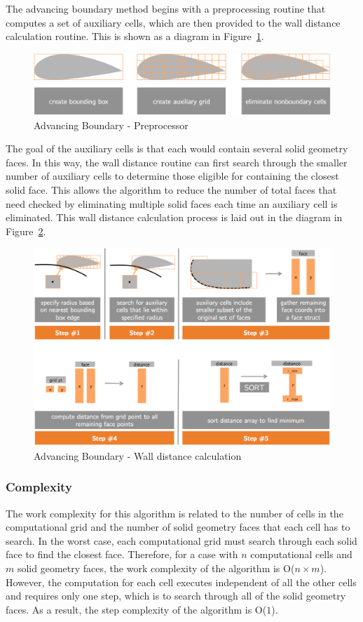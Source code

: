\documentclass[]{aiaa-tc}%
\begin{document}
The advancing boundary method begins with a preprocessing routine that
computes a set of auxiliary cells, which are then provided to the wall
distance calculation routine. This is shown
as a diagram in Figure~\ref{f:ab_preprocessor}.

\begin{figure}
  \centering
  \includegraphics[width=0.6\linewidth]{figures/preprocessor/preprocessor_diagram}
  \caption{Advancing Boundary - Preprocessor}
  \label{f:ab_preprocessor}
\end{figure}


The goal of the auxiliary cells is that each would contain several
solid geometry faces. In this way, the wall distance routine can first
search through the smaller number of auxiliary cells to determine
those eligible for containing the closest solid face. This allows the
algorithm to reduce the number of total faces that need checked by
eliminating multiple solid faces each time an auxiliary cell is
eliminated. This wall distance calculation process is laid out in the diagram
in Figure~\ref{f:ab_diagram}.


\begin{figure}
  \centering
  \includegraphics[width=0.7\linewidth]{figures/auxiliary_grid/algorithm_diagram}
  \caption{Advancing Boundary - Wall distance calculation}
  \label{f:ab_diagram}
\end{figure}



\subsubsection{Complexity}

The work complexity for this algorithm is related to the number of
cells in the computational grid and the number of solid geometry faces
that each cell has to search. In the worst case, each computational
grid must search through each solid face to find the closest
face. Therefore, for a case with $n$ computational cells and $m$ solid
geometry faces, the work complexity of the algorithm is O($n \times
m$). However, the computation for each cell executes independent of
all the other cells and requires only one step, which is to search
through all of the solid geometry faces. As a result, the step
complexity of the algorithm is O($1$).
\end{document}
